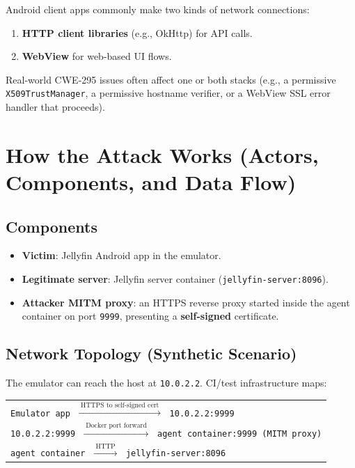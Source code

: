 \documentclass[11pt]{article}
\begin{document}
Android client apps commonly make two kinds of network connections:
\begin{enumerate}
  \item \textbf{HTTP client libraries} (e.g., OkHttp) for API calls.
  \item \textbf{WebView} for web-based UI flows.
\end{enumerate}

Real-world CWE-295 issues often affect one or both stacks (e.g., a permissive \texttt{X509TrustManager}, a permissive hostname verifier, or a WebView SSL error handler that proceeds).

\section{How the Attack Works (Actors, Components, and Data Flow)}

\subsection*{Components}
\begin{itemize}
  \item \textbf{Victim}: Jellyfin Android app in the emulator.
  \item \textbf{Legitimate server}: Jellyfin server container (\texttt{jellyfin-server:8096}).
  \item \textbf{Attacker MITM proxy}: an HTTPS reverse proxy started inside the agent container on port \texttt{9999}, presenting a \textbf{self-signed} certificate.
\end{itemize}

\subsection*{Network Topology (Synthetic Scenario)}

The emulator can reach the host at \texttt{10.0.2.2}. CI/test infrastructure maps:
\begin{center}
\begin{tabular}{l}
\texttt{Emulator app} $\;\xrightarrow{\;\text{HTTPS to self-signed cert}\;}\;$ \texttt{10.0.2.2:9999} \\
\texttt{10.0.2.2:9999} $\;\xrightarrow{\;\text{Docker port forward}\;}\;$ \texttt{agent container:9999 (MITM proxy)} \\
\texttt{agent container} $\;\xrightarrow{\;\text{HTTP}\;}\;$ \texttt{jellyfin-server:8096} \\
\end{tabular}
\end{center}
\end{document}
